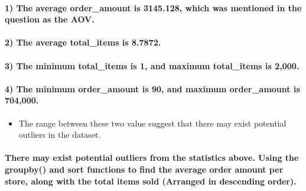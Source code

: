 \documentclass[11pt]{article}
\providecommand{\tightlist}{%
      \setlength{\itemsep}{0pt}\setlength{\parskip}{0pt}}
\begin{document}
\hypertarget{the-average-order_amount-is-3145.128-which-was-mentioned-in-the-question-as-the-aov.}{%
\paragraph{1) The average order\_amount is 3145.128, which was mentioned
in the question as the
AOV.}\label{the-average-order_amount-is-3145.128-which-was-mentioned-in-the-question-as-the-aov.}}

\hypertarget{the-average-total_items-is-8.7872.}{%
\paragraph{2) The average total\_items is
8.7872.}\label{the-average-total_items-is-8.7872.}}

\hypertarget{the-minimum-total_items-is-1-and-maximum-total_items-is-2000.}{%
\paragraph{3) The minimum total\_items is 1, and maximum total\_items is
2,000.}\label{the-minimum-total_items-is-1-and-maximum-total_items-is-2000.}}

\hypertarget{the-minimum-order_amount-is-90-and-maximum-order_amount-is-704000.}{%
\paragraph{4) The minimum order\_amount is 90, and maximum order\_amount
is
704,000.}\label{the-minimum-order_amount-is-90-and-maximum-order_amount-is-704000.}}

\begin{itemize}
\tightlist
\item
  The range between these two value suggest that there may exist
  potential outliers in the dataset.
\end{itemize}

    \hypertarget{there-may-exist-potential-outliers-from-the-statistics-above.-using-the-groupby-and-sort-functions-to-find-the-average-order-amount-per-store-along-with-the-total-items-sold-arranged-in-descending-order.}{%
\paragraph{There may exist potential outliers from the statistics above.
Using the groupby() and sort functions to find the average order amount
per store, along with the total items sold (Arranged in descending
order).}\label{there-may-exist-potential-outliers-from-the-statistics-above.-using-the-groupby-and-sort-functions-to-find-the-average-order-amount-per-store-along-with-the-total-items-sold-arranged-in-descending-order.}}
\end{document}
